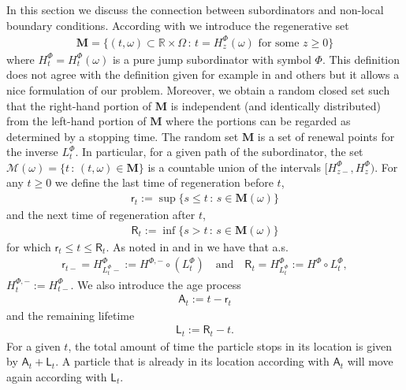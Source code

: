 \documentclass[11pt,a4paper]{article}
\theoremstyle{plain}
\theoremstyle{definition}
\theoremstyle{remark}
\begin{document}
	In this section we discuss the connection between subordinators and non-local boundary conditions. According with \cite{MeSt14} we introduce the regenerative set
	\begin{align*}
		\mathbf{M} = \{(t,\omega) \subset \mathbb{R} \times \Omega\,:\, t = H^\Phi_z(\omega) \textrm{ for some } z\geq 0\}
	\end{align*}
	where $H^\Phi_t=H^\Phi_t(\omega)$ is a pure jump subordinator with symbol $\Phi$. This definition does not agree with the definition given for example in \cite{Mais1983} and others but it allows a nice formulation of our problem. Moreover, we obtain a random closed set such that the right-hand portion of $\mathbf{M}$ is independent (and identically distributed) from the left-hand portion of $\mathbf{M}$ where the portions can be regarded as determined by a stopping time.  The random set $\mathbf{M}$ is a set of renewal points for the inverse $L^\Phi_t$. In particular, for a given path of the subordinator, the set $\mathcal{M}(\omega) = \{t \,:\, (t,\omega) \in \mathbf{M} \}$ is a countable union of the intervals $[H^\Phi_{z-}, H^\Phi_z)$.  For any $t\geq 0$ we define the last time of regeneration before $t$,
	\begin{align*}
		\mathsf{r}_t := \sup\{s \leq t\,:\, s\in \mathbf{M}(\omega) \}
	\end{align*}
	and the next time of regeneration after $t$, 
	\begin{align*}
		\mathsf{R}_t := \inf\{s > t\,:\, s \in \mathbf{M}(\omega) \}
	\end{align*}
	for which $\mathsf{r}_t \leq t \leq \mathsf{R}_t$. As noted in \cite{MeSt14} and in \cite[Section 2]{bertoin1999subordinators} we have that a.s. 
	\begin{align*}
		\mathsf{r}_{t-} = H^\Phi_{L^\Phi_t -} := H^{\Phi,-} \circ (L^\Phi_t) \quad \textrm{and} \quad \mathsf{R}_t = H^\Phi_{L^\Phi_t} := H^\Phi \circ L^\Phi_t,
	\end{align*}
	\(H^{\Phi,-}_t:=H^\Phi_{t-} \). We also introduce the age process 
	\begin{align*}
		\mathsf{A}_t := t - \mathsf{r}_t
	\end{align*}
	and the remaining lifetime 
	\begin{align*}
		\mathsf{L}_t := \mathsf{R}_t - t.
	\end{align*}
	For a given $t$, the total amount of time the particle stops in its location is given by $\mathsf{A}_t + \mathsf{L}_t$. A particle that is already in its location according with $\mathsf{A}_t$ will move again according with $\mathsf{L}_t$. 
	
\end{document}
